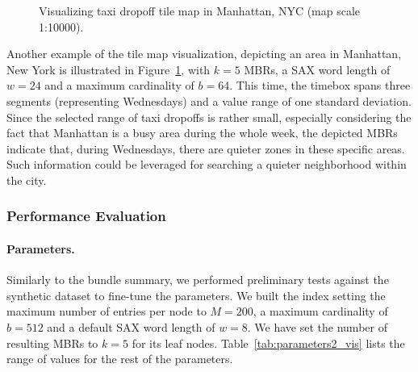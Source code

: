 \begin{figure}[!ht]
 \centering
 \caption{Visualizing taxi dropoff tile map in Manhattan, NYC (map scale 1:10000).}
 \label{fig:nyc_example2}
\end{figure}

Another example of the tile map visualization, depicting an area in Manhattan, New York is illustrated in Figure~\ref{fig:nyc_example2}, with $k=5$ MBRs, a SAX word length of $w=24$ and a maximum cardinality of $b=64$. This time, the timebox spans three \isax segments (representing Wednesdays) and a value range of one standard deviation. Since the selected range of taxi dropoffs is rather small, especially considering the fact that Manhattan is a busy area during the whole week, the depicted MBRs indicate that, during Wednesdays, there are quieter zones in these specific areas. Such information could be leveraged for searching a quieter neighborhood within the city.

\subsubsection{Performance Evaluation}
\label{subsubsec:tilemap_sum_benchmarking}

\paragraph{Parameters.} Similarly to the bundle summary, we performed preliminary tests against the synthetic dataset to fine-tune the parameters. We built the \hisax index setting the maximum number of entries per node to $M=200$, a maximum cardinality of $b=512$ and a default SAX word length of $w=8$. We have set the number of resulting MBRs to $k = 5$ for its leaf nodes. Table~\ref{tab:parameters2_vis} lists the range of values for the rest of the parameters.

